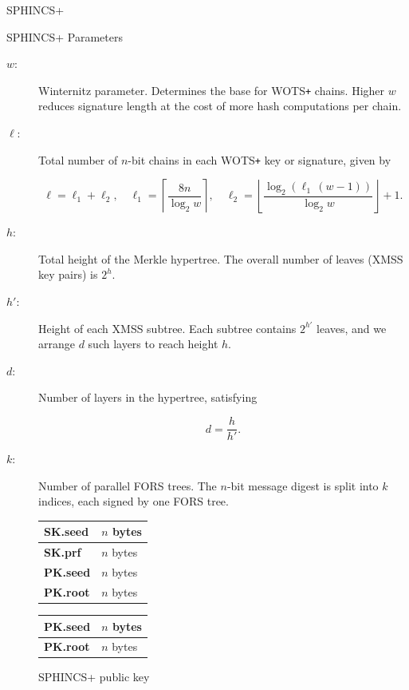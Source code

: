 \documentclass[version=preprint]{iacrcc}
\begin{document}
\begin{section}{SPHINCS+}
\begin{subsection}{SPHINCS+ Parameters}
\begin{description}
  \item[$w$:] Winternitz parameter. Determines the base for WOTS\texttt{+} chains.  
    Higher $w$ reduces signature length at the cost of more hash computations per chain.

  \item[$\ell$:] Total number of $n$-bit chains in each WOTS\texttt{+} key or signature, given by


\[
    \ell = \ell_1 + \ell_2,
    \quad
    \ell_1 = \left\lceil \frac{8n}{\log_2 w} \right\rceil,
    \quad
    \ell_2 = \left\lfloor \frac{\log_2(\ell_1\,(w-1))}{\log_2 w} \right\rfloor + 1.
  \]

  \item[$h$:] Total height of the Merkle hypertree.  
    The overall number of leaves (XMSS key pairs) is $2^h$.

  \item[$h'$:] Height of each XMSS subtree.  
    Each subtree contains $2^{h'}$ leaves, and we arrange $d$ such layers to reach height $h$.

  \item[$d$:] Number of layers in the hypertree, satisfying
  
\[
    d = \frac{h}{h'}.
  \]

  \item[$k$:] Number of parallel FORS trees.  
    The $n$-bit message digest is split into $k$ indices, each signed by one FORS tree.
\end{description}
    \end{subsection}
    


    \begin{figure}[H]
        \centering
        \begin{minipage}{0.45\textwidth}
        \centering
        \begin{tabular}{|l|l|}
        \hline
        \textbf{SK.seed} & $n$ bytes \\
        \hline
        \textbf{SK.prf}  & $n$ bytes \\
        \hline
        \textbf{PK.seed} & $n$ bytes \\
        \hline
        \textbf{PK.root} & $n$ bytes \\
        \hline
        \end{tabular}
        \caption{SPHINCS+ private key}
        \label{fig:slhdsa_privatekey}
        \end{minipage}
        \hfill
        \begin{minipage}{0.45\textwidth}
        \centering
        \begin{tabular}{|l|l|}
        \hline
        \textbf{PK.seed} & $n$ bytes \\
        \hline
        \textbf{PK.root} & $n$ bytes \\
        \hline
        \end{tabular}
        \caption{SPHINCS+ public key}
        \label{fig:slhdsa_publickey}
        \end{minipage}
        

\end{figure}
\end{section}
\end{document}
